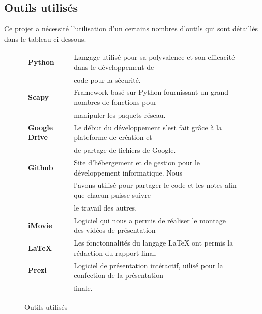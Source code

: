 \documentclass[11pt]{article}
\begin{document}
\subsection{Outils utilisés}
Ce projet a nécessité l'utilisation d'un certains nombres d'outils qui sont détaillés dans le tableau ci-dessous.~\\
\begin{figure}[h]
\centering
\begin{tabular}{|l|l|}
\hline
   \textbf{Python} & Langage utilisé pour sa polyvalence et son efficacité dans le développement de  \\
    &code pour la sécurité. \\ \hline
    \textbf{Scapy} & Framework basé sur Python fournissant un grand nombres de fonctions pour  \\
    & manipuler les paquets réseau. \\ \hline
   \textbf{Google Drive} & Le début du développement s'est fait grâce à la plateforme de création et  \\
	& de partage de fichiers de Google. \\ \hline
\textbf{Github} & Site d'hébergement et de gestion pour le développement informatique. Nous \\ 
&   l'avons utilisé pour partager le code et les notes afin que chacun puisse suivre   \\
&  le travail des autres. \\ \hline
\textbf{iMovie} & Logiciel qui nous a permis de réaliser le montage des vidéos de présentation \\ \hline
\textbf{LaTeX} & Les fonctonnalités du langage LaTeX ont permis la rédaction du rapport final. \\ \hline
\textbf{Prezi} & Logiciel de présentation intéractif, uilisé pour la confection de la présentation \\
& finale.\\ \hline
\end{tabular}
\caption{Outils utilisés}
\end{figure}
\end{document}
